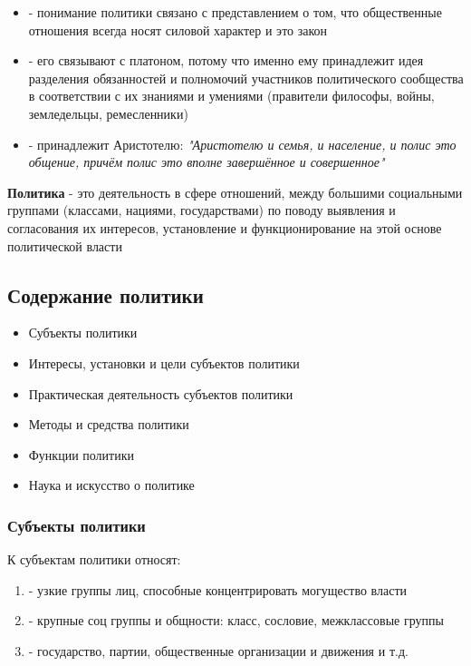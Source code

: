 \begin{itemize}
  \item {} - понимание политики связано с
        представлением о том, что общественные отношения всегда носят силовой характер
        и это закон
  \item {} - его связывают с платоном, потому что именно ему
        принадлежит идея разделения обязанностей и полномочий участников политического
        сообщества в соответствии с их знаниями и умениями (правители философы, войны,
        земледельцы, ремесленники)
  \item {} - принадлежит Аристотелю: \textit{"Аристотелю и
          семья, и население, и полис это общение, причём полис это вполне завершённое и
          совершенное"}
\end{itemize}

\textbf{Политика} - это деятельность в сфере отношений, между большими социальными
группами (классами, нациями, государствами) по поводу выявления и согласования их
интересов, установление и функционирование на этой основе политической власти

\subsection{Содержание политики}

\begin{itemize}
  \item Субъекты политики
  \item Интересы, установки и цели субъектов политики
  \item Практическая деятельность субъектов политики
  \item Методы и средства политики
  \item Функции политики
  \item Наука и искусство о политике
\end{itemize}

\subsubsection{Субъекты политики}

К субъектам политики относят:
\begin{enumerate}
  \item {} - узкие группы лиц, способные
        концентрировать могущество власти
  \item {} - крупные соц группы и общности: класс,
        сословие, межклассовые группы
  \item {} - государство, партии, общественные
        организации и движения и т.д.
\end{enumerate}

